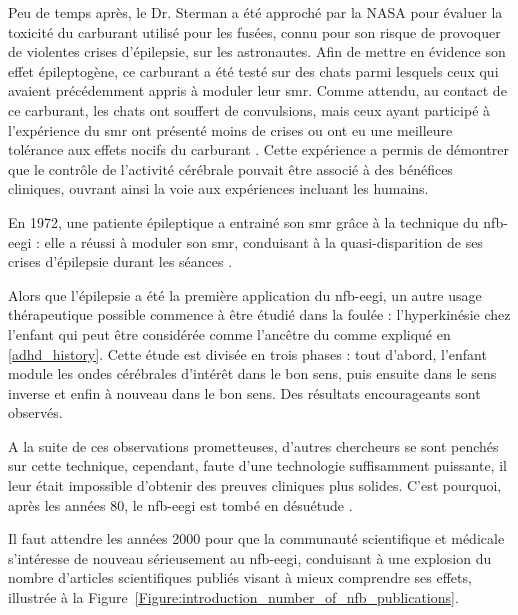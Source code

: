 Peu de temps après, le Dr. Sterman a été approché par la NASA pour évaluer la toxicité du carburant utilisé pour les fusées, connu pour son risque de provoquer de violentes crises
d'épilepsie, sur les astronautes. Afin de mettre en évidence son effet épileptogène, ce carburant a été testé sur des chats parmi lesquels ceux qui avaient précédemment appris 
à moduler leur \gls{smr}. Comme attendu, au contact de ce carburant, les chats
ont souffert de convulsions, mais ceux ayant participé à l'expérience du \gls{smr} ont présenté moins de crises ou ont eu une meilleure tolérance aux effets nocifs du carburant \citep{Sterman1974}.  
Cette expérience a permis de démontrer que le contrôle de l'activité cérébrale pouvait être associé à des bénéfices cliniques, ouvrant ainsi la voie aux expériences incluant les humains.

En 1972, une patiente épileptique a entrainé son \gls{smr} grâce à la technique du \gls{nfb}-\gls{eegi} : elle a réussi à moduler son \gls{smr}, conduisant à la quasi-disparition de ses crises 
d'épilepsie durant les séances \citep{Sterman1974}. 

Alors que l'épilepsie a été la première application du \gls{nfb}-\gls{eegi}, un autre usage thérapeutique possible commence à être étudié dans la foulée : l'hyperkinésie chez l'enfant \citep{Lubar1976ADHD}
qui peut être considérée comme l'ancêtre du  comme expliqué en \ref{adhd_history}. Cette étude est divisée en trois phases : tout d'abord, l'enfant module les ondes cérébrales d'intérêt 
dans le bon sens, puis ensuite dans le sens inverse et enfin à nouveau dans le bon sens. Des résultats encourageants sont observés.

A la suite de ces observations prometteuses, d'autres chercheurs se sont penchés sur cette technique, cependant, faute d'une technologie suffisamment puissante, il leur était impossible
d'obtenir des preuves cliniques plus solides. C'est pourquoi, après les années 80, le \gls{nfb}-\gls{eegi} est tombé en désuétude \citep{Masterpasqua2003}.
 
Il faut attendre les années 2000 pour que la communauté scientifique et médicale s'intéresse de nouveau sérieusement au \gls{nfb}-\gls{eegi}, conduisant à une explosion du nombre d'articles scientifiques publiés 
visant à mieux comprendre ses effets, illustrée à la Figure~\ref{Figure:introduction_number_of_nfb_publications}. 

